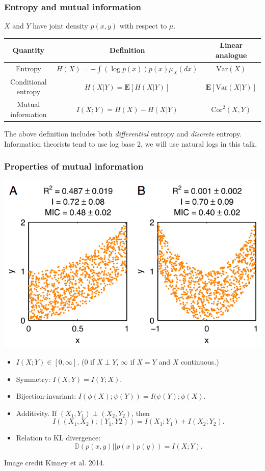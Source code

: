 \documentclass{beamer}
\newcommand{\E}{\textbf{E}}
\begin{document}
\begin{frame}
\frametitle{Entropy and mutual information}
$X$ and $Y$ have joint density $p(x, y)$ with respect to $\mu$.

\vspace{0.5in}

\begin{tabular}{c|c|c}
\hline
Quantity & Definition & Linear analogue\\\hline
Entropy & $H(X) = - \int (\log p(x)) p(x) \mu_X(dx)$ & $\text{Var}(X)$\\
Conditional entropy & $H(X|Y) = \E[H(X|Y)]$ & $\E[\text{Var}(X|Y)]$\\
Mutual information & $I(X;Y) = H(X) - H(X|Y)$ & $\text{Cor}^2(X, Y)$\\\hline
\end{tabular}

\vspace{0.3in}

\small{The above definition includes both \emph{differential} entropy and \emph{discrete} entropy.
Information theorists tend to use log base 2, we will use natural logs in this talk.}
\end{frame}

\begin{frame}
\frametitle{Properties of mutual information}
\begin{center}
\includegraphics[scale = 0.2]{kinney.png}
\end{center}
\begin{itemize}
\item $I(X;Y) \in [0,\infty]$.  (0 if $X \perp Y$, $\infty$ if $X=Y$ and $X$ continuous.)
\item Symmetry: $I(X;Y) = I(Y; X)$.
\item Bijection-invariant: $I(\phi(X); \psi(Y)) = I(\psi(Y);\phi(X)$.
\item Additivity.  If $(X_1,Y_1) \perp (X_2, Y_2)$, then
\[
I((X_1, X_2); (Y_1, Y2)) = I(X_1; Y_1) + I(X_2; Y_2).
\]
\item Relation to KL divergence:
\[
\mathbb{D}(p(x, y)||p(x)p(y)) = I(X; Y).
\]
\end{itemize}
\tiny{Image credit Kinney et al. 2014.}
\end{frame}
\end{document}
